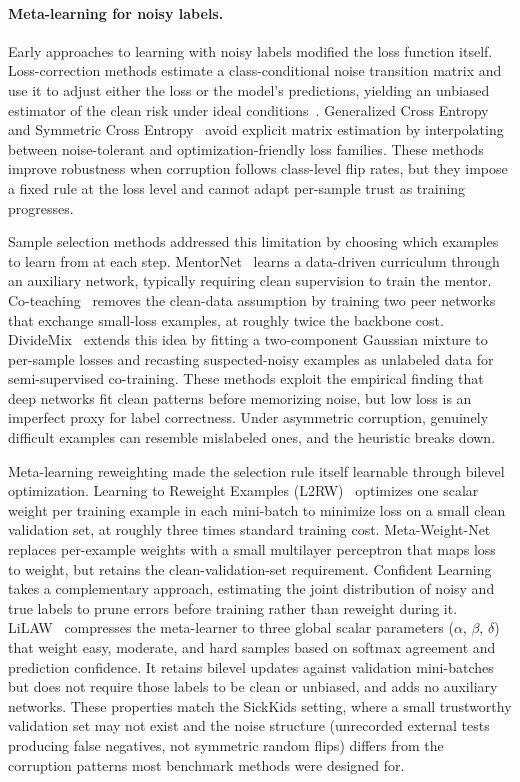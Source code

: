 \paragraph{Meta-learning for noisy labels.}
Early approaches to learning with noisy labels modified the loss function itself. Loss-correction methods estimate a class-conditional noise transition matrix and use it to adjust either the loss or the model's predictions, yielding an unbiased estimator of the clean risk under ideal conditions~\cite{patrini_making_2017}. Generalized Cross Entropy~\cite{zhang_generalized_2018} and Symmetric Cross Entropy~\cite{wang_symmetric_2019} avoid explicit matrix estimation by interpolating between noise-tolerant and optimization-friendly loss families. These methods improve robustness when corruption follows class-level flip rates, but they impose a fixed rule at the loss level and cannot adapt per-sample trust as training progresses.

Sample selection methods addressed this limitation by choosing which examples to learn from at each step. MentorNet~\cite{jiang_mentornet_2018} learns a data-driven curriculum through an auxiliary network, typically requiring clean supervision to train the mentor. Co-teaching~\cite{han_coteaching_2018} removes the clean-data assumption by training two peer networks that exchange small-loss examples, at roughly twice the backbone cost. DivideMix~\cite{li_dividemix_2020} extends this idea by fitting a two-component Gaussian mixture to per-sample losses and recasting suspected-noisy examples as unlabeled data for semi-supervised co-training. These methods exploit the empirical finding that deep networks fit clean patterns before memorizing noise, but low loss is an imperfect proxy for label correctness. Under asymmetric corruption, genuinely difficult examples can resemble mislabeled ones, and the heuristic breaks down.

Meta-learning reweighting made the selection rule itself learnable through bilevel optimization. Learning to Reweight Examples (L2RW)~\cite{ren_learning_2018} optimizes one scalar weight per training example in each mini-batch to minimize loss on a small clean validation set, at roughly three times standard training cost. Meta-Weight-Net~\cite{shu_meta-weight-net_2019} replaces per-example weights with a small multilayer perceptron that maps loss to weight, but retains the clean-validation-set requirement. Confident Learning~\cite{northcutt_confident_learning_2019} takes a complementary approach, estimating the joint distribution of noisy and true labels to prune errors before training rather than reweight during it. LiLAW~\cite{moturu_lilaw_2025} compresses the meta-learner to three global scalar parameters ($\alpha$, $\beta$, $\delta$) that weight easy, moderate, and hard samples based on softmax agreement and prediction confidence. It retains bilevel updates against validation mini-batches but does not require those labels to be clean or unbiased, and adds no auxiliary networks. These properties match the SickKids setting, where a small trustworthy validation set may not exist and the noise structure (unrecorded external tests producing false negatives, not symmetric random flips) differs from the corruption patterns most benchmark methods were designed for.
